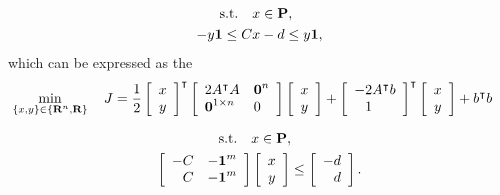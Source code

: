\documentclass{article}
\begin{document}
    \begin{align*}
        \text{s.t.}\quad &x\in\textbf{P},\\
            -y\textbf{1} \leq    C &x - d \leq  y\textbf{1},
    \end{align*}
    which can be expressed as the \QP
    \begin{align*}
        \min_{\{x,y\}\in\{\R^n,\R\}} \quad 
        J & = \frac{1}{2}
        \left[\begin{array}{c}
            x   \\
            y
        \end{array}\right]^\tp
        \left[\begin{array}{lll}
            2A^\tp A
        &
            \zeros^{n}
        \\ 
            \zeros^{1\times n}
        &
            0
        \end{array}\right]
        \left[\begin{array}{c}
            x   \\
            y
        \end{array}\right]
        +
        \left[\begin{array}{l}
            -2 A^\tp b
            \\
            \minus 1
        \end{array}\right]^\tp
        \left[\begin{array}{c}
            x   \\
            y
        \end{array}\right]
        +
        b^\tp b
    \end{align*}

    \begin{align*}
        \st\quad &x\in\poly,
        \\
        \left[\begin{array}{lll}
                -C
            &
                -\ones^{m}
            \\
                \minus C 
            &
                -\ones^{m}
        \end{array}\right]
        &\left[\begin{array}{c}
            x   \\
            y
        \end{array}\right]
        \leq
        \left[\begin{array}{l}
            -d           \\
            \minus d
        \end{array}\right].
    \end{align*}
\end{document}
